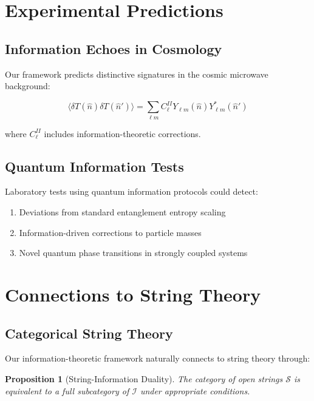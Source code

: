 \documentclass[12pt,a4paper]{article}
\newtheorem{proposition}[theorem]{Proposition}
\begin{document}
\section{Experimental Predictions}

\subsection{Information Echoes in Cosmology}

Our framework predicts distinctive signatures in the cosmic microwave background:

\begin{equation}
\langle \delta T(\hat{n}) \delta T(\hat{n}') \rangle = \sum_{\ell m} C_\ell^{II} Y_{\ell m}(\hat{n}) Y_{\ell m}^*(\hat{n}')
\end{equation}

where $C_\ell^{II}$ includes information-theoretic corrections.

\subsection{Quantum Information Tests}

Laboratory tests using quantum information protocols could detect:
\begin{enumerate}
\item Deviations from standard entanglement entropy scaling
\item Information-driven corrections to particle masses
\item Novel quantum phase transitions in strongly coupled systems
\end{enumerate}

\section{Connections to String Theory}

\subsection{Categorical String Theory}

Our information-theoretic framework naturally connects to string theory through:

\begin{proposition}[String-Information Duality]
The category of open strings $\mathcal{S}$ is equivalent to a full subcategory of $\mathcal{I}$ under appropriate conditions.
\end{proposition}
\end{document}
